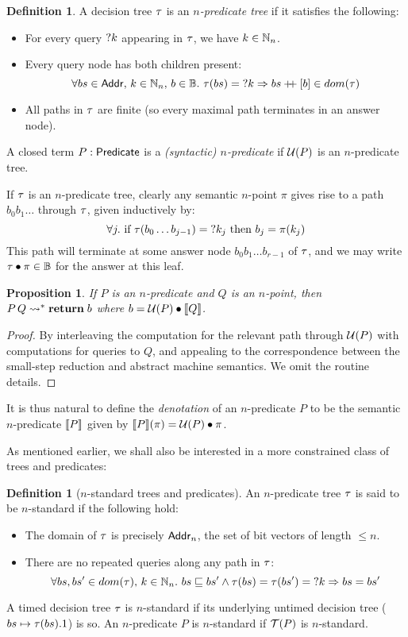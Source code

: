 \documentclass[12pt,phd,lfcs,twoside,openright,logo,leftchapter,normalheadings]{infthesis}
\theoremstyle{plain}
\newtheorem{proposition}[theorem]{Proposition}
\theoremstyle{definition}
\newtheorem{definition}[theorem]{Definition}
\begin{document}
\begin{definition}  \label{def:n-predicate}
A decision tree $\tau$ is an \emph{$n$-predicate tree} if it satisfies the following:
\begin{itemize}
  \item For every query $\mathord{?} k$ appearing in $\tau$, we have $k \in \mathbb{N}_n$.
  \item Every query node has both children present:
  \[ \forall bs \in \mathsf{Addr},\, k \in \mathbb{N}_n,\, b \in \mathbb{B}.~ \tau(bs) = \mathord{?} k \Rightarrow bs \mathbin{+\!\!+} [b] \in dom(\tau) \]
  \item All paths in $\tau$ are finite (so every maximal path terminates in an answer node).
\end{itemize}
A closed term $P: \mathsf{Predicate}$ is a \emph{(syntactic) $n$-predicate} if $\mathcal{U}(P)$ is an $n$-predicate tree.
\end{definition}

If $\tau$ is an $n$-predicate tree, clearly any semantic $n$-point $\pi$ gives rise to a path $b_0 b_1 \dots $
through $\tau$, given inductively by:
{
\[  \forall j.~ \mbox{if~} \tau(b_0\dots b_{j-1}) = \mathord{?} k_j \mbox{~then~} b_j = \pi(k_j)  \]
}%
This path will terminate at some answer node $b_0 b_1 \dots b_{r-1}$ of $\tau$,
and we may write $\tau \bullet \pi \in \mathbb{B}$ for the answer at this leaf.

\begin{proposition}  \label{prop:pred-tree}
If $P$ is an $n$-predicate and $Q$ is an $n$-point, then
$P\,Q \leadsto^\ast \mathbf{return}\;b$ where $b = \tru(P) \bullet \val{Q}$.
\end{proposition}

\begin{proof}
By interleaving the computation for the relevant path through $\mathcal{U}(P)$
with computations for queries to $Q$, and appealing to the correspondence between
the small-step reduction and abstract machine semantics.
We omit the routine details.
\end{proof}

It is thus natural to define the \emph{denotation} of an $n$-predicate
$P$ to be the semantic $n$-predicate $\val{P}$ given by
$\llbracket P \rrbracket (\pi) = \mathcal{U}(P) \bullet \pi$.

As mentioned earlier, we shall also be interested in a more constrained
class of trees and predicates:

\begin{definition}[$n$-standard trees and predicates]
An $n$-predicate tree $\tau$ is said to be $n$-standard if the following hold:
\begin{itemize}
\item The domain of $\tau$ is precisely $\mathsf{Addr}_n$, the set of bit vectors of length $\leq n$.
\item There are no repeated queries along any path in $\tau$:
  \[ \forall bs, bs' \in dom(\tau),\, k \in \mathbb{N}_n.~ bs \sqsubseteq bs' \wedge \tau(bs)=\tau(bs')=\mathord{?} k \Rightarrow bs=bs' \]
\end{itemize}
A timed decision tree $\tau$ is $n$-standard if its underlying untimed
decision tree ($bs \mapsto \tau(bs).1$) is so.
An $n$-predicate $P$ is $n$-standard if $\mathcal{T}(P)$ is $n$-standard.
\end{definition}
\end{document}
